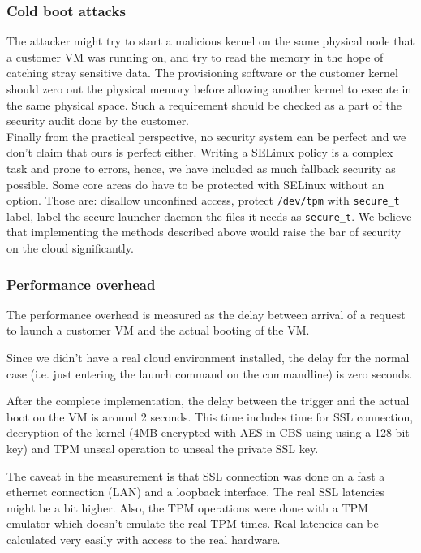 \documentclass[10pt,twocolumn,pdftex]{article}
\begin{document}
\subsubsection{Cold boot attacks}
The attacker might try to start a malicious kernel on the same physical node that a customer VM was running on, and try to read the memory in the hope of catching stray sensitive data. The provisioning software or the customer kernel should zero out the physical memory before allowing another kernel to execute in the same physical space. Such a requirement should be checked as a part of the security audit done by the customer. 
\\

Finally from the practical perspective, no security system can be perfect and we don't claim that ours is perfect either. Writing a SELinux policy is a complex task and prone to errors, hence, we have included as much fallback security as possible. Some core areas do have to be protected with SELinux without an option. Those are: disallow unconfined access, protect {\tt /dev/tpm} with {\tt secure\_t} label, label the secure launcher daemon the files it needs as {\tt secure\_t}. We believe that implementing the methods described above would raise the bar of security on the cloud significantly.

\subsubsection{Performance overhead}
The performance overhead is measured as the delay between arrival of a request to launch a customer VM and the actual booting of the VM. 

Since we didn't have a real cloud environment installed, the delay for the normal case (i.e. just entering the launch command on the commandline) is zero seconds.

After the complete implementation, the delay between the trigger and the actual boot on the VM is around 2 seconds. This time includes time for SSL connection, decryption of the kernel (4MB encrypted with AES in CBS using using a 128-bit key) and TPM unseal operation to unseal the private SSL key. 

The caveat in the measurement is that SSL connection was done on a fast a ethernet connection (LAN) and a loopback interface. The real SSL latencies might be a bit higher. Also, the TPM operations were done with a TPM emulator which doesn't emulate the real TPM times. Real latencies can be calculated very easily with access to the real hardware. 
\end{document}
